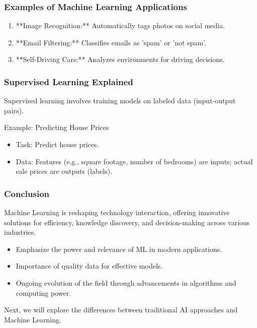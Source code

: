 \documentclass[aspectratio=169]{beamer}
\begin{document}
\begin{frame}[fragile]
    \frametitle{Examples of Machine Learning Applications}
    \begin{enumerate}
        \item **Image Recognition:** Automatically tags photos on social media.
        \item **Email Filtering:** Classifies emails as 'spam' or 'not spam'.
        \item **Self-Driving Cars:** Analyzes environments for driving decisions.
    \end{enumerate}
\end{frame}

\begin{frame}[fragile]
    \frametitle{Supervised Learning Explained}
    Supervised learning involves training models on labeled data (input-output pairs). 

    \begin{block}{Example: Predicting House Prices}
        \begin{itemize}
            \item Task: Predict house prices.
            \item Data: Features (e.g., square footage, number of bedrooms) are inputs; actual sale prices are outputs (labels).
        \end{itemize}
    \end{block}
\end{frame}

\begin{frame}[fragile]
    \frametitle{Conclusion}
    Machine Learning is reshaping technology interaction, offering innovative solutions for efficiency, knowledge discovery, and decision-making across various industries. 

    \begin{itemize}
        \item Emphasize the power and relevance of ML in modern applications.
        \item Importance of quality data for effective models.
        \item Ongoing evolution of the field through advancements in algorithms and computing power.
    \end{itemize}

    Next, we will explore the differences between traditional AI approaches and Machine Learning.
\end{frame}
\end{document}
